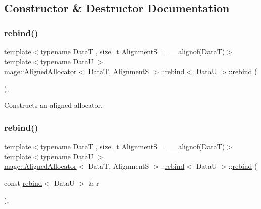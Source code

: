 \subsection{Constructor \& Destructor Documentation}
\hypertarget{structmage_1_1_aligned_allocator_1_1rebind_a2b26e5afbed6b26f73ed0186c2ff52d6}{}\label{structmage_1_1_aligned_allocator_1_1rebind_a2b26e5afbed6b26f73ed0186c2ff52d6} 
\subsubsection{\texorpdfstring{rebind()}{rebind()}\hspace{0.1cm}{\footnotesize\ttfamily [1/3]}}
{\footnotesize\ttfamily template$<$typename DataT , size\+\_\+t AlignmentS = \+\_\+\+\_\+alignof(\+Data\+T)$>$ \\
template$<$typename DataU $>$ \\
\hyperlink{structmage_1_1_aligned_allocator}{mage\+::\+Aligned\+Allocator}$<$ DataT, AlignmentS $>$\+::\hyperlink{structmage_1_1_aligned_allocator_1_1rebind}{rebind}$<$ DataU $>$\+::\hyperlink{structmage_1_1_aligned_allocator_1_1rebind}{rebind} (\begin{DoxyParamCaption}{ }\end{DoxyParamCaption})\hspace{0.3cm}{\ttfamily [private]}, {\ttfamily [delete]}}

Constructs an aligned allocator. \hypertarget{structmage_1_1_aligned_allocator_1_1rebind_ad3132b0e4a5661ccb9fb33283ea4003e}{}\label{structmage_1_1_aligned_allocator_1_1rebind_ad3132b0e4a5661ccb9fb33283ea4003e} 
\subsubsection{\texorpdfstring{rebind()}{rebind()}\hspace{0.1cm}{\footnotesize\ttfamily [2/3]}}
{\footnotesize\ttfamily template$<$typename DataT , size\+\_\+t AlignmentS = \+\_\+\+\_\+alignof(\+Data\+T)$>$ \\
template$<$typename DataU $>$ \\
\hyperlink{structmage_1_1_aligned_allocator}{mage\+::\+Aligned\+Allocator}$<$ DataT, AlignmentS $>$\+::\hyperlink{structmage_1_1_aligned_allocator_1_1rebind}{rebind}$<$ DataU $>$\+::\hyperlink{structmage_1_1_aligned_allocator_1_1rebind}{rebind} (\begin{DoxyParamCaption}\item[{const \hyperlink{structmage_1_1_aligned_allocator_1_1rebind}{rebind}$<$ DataU $>$ \&}]{r }\end{DoxyParamCaption})\hspace{0.3cm}{\ttfamily [private]}, {\ttfamily [delete]}}

